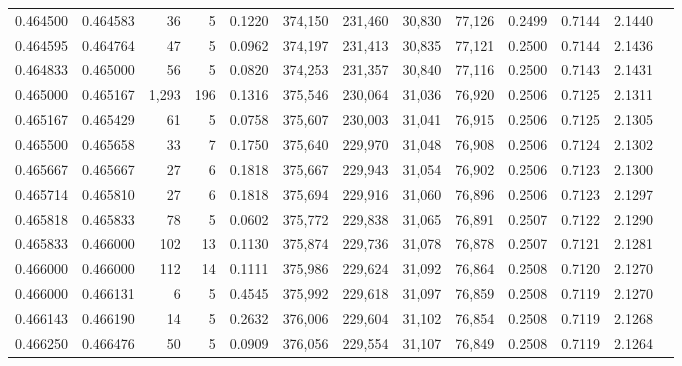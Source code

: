 \begin{tabular}{rrrrrrrrrrrrr}
0.464500 & 0.464583 &    36 &   5 &                                     0.1220 & 374,150 & 231,460 &  30,830 &  77,126 & 0.2499 & 0.7144 & 2.1440 \\
0.464595 & 0.464764 &    47 &   5 &                                     0.0962 & 374,197 & 231,413 &  30,835 &  77,121 & 0.2500 & 0.7144 & 2.1436 \\
0.464833 & 0.465000 &    56 &   5 &                                     0.0820 & 374,253 & 231,357 &  30,840 &  77,116 & 0.2500 & 0.7143 & 2.1431 \\
0.465000 & 0.465167 & 1,293 & 196 &                                     0.1316 & 375,546 & 230,064 &  31,036 &  76,920 & 0.2506 & 0.7125 & 2.1311 \\
0.465167 & 0.465429 &    61 &   5 &                                     0.0758 & 375,607 & 230,003 &  31,041 &  76,915 & 0.2506 & 0.7125 & 2.1305 \\
0.465500 & 0.465658 &    33 &   7 &                                     0.1750 & 375,640 & 229,970 &  31,048 &  76,908 & 0.2506 & 0.7124 & 2.1302 \\
0.465667 & 0.465667 &    27 &   6 &                                     0.1818 & 375,667 & 229,943 &  31,054 &  76,902 & 0.2506 & 0.7123 & 2.1300 \\
0.465714 & 0.465810 &    27 &   6 &                                     0.1818 & 375,694 & 229,916 &  31,060 &  76,896 & 0.2506 & 0.7123 & 2.1297 \\
0.465818 & 0.465833 &    78 &   5 &                                     0.0602 & 375,772 & 229,838 &  31,065 &  76,891 & 0.2507 & 0.7122 & 2.1290 \\
0.465833 & 0.466000 &   102 &  13 &                                     0.1130 & 375,874 & 229,736 &  31,078 &  76,878 & 0.2507 & 0.7121 & 2.1281 \\
0.466000 & 0.466000 &   112 &  14 &                                     0.1111 & 375,986 & 229,624 &  31,092 &  76,864 & 0.2508 & 0.7120 & 2.1270 \\
0.466000 & 0.466131 &     6 &   5 &                                     0.4545 & 375,992 & 229,618 &  31,097 &  76,859 & 0.2508 & 0.7119 & 2.1270 \\
0.466143 & 0.466190 &    14 &   5 &                                     0.2632 & 376,006 & 229,604 &  31,102 &  76,854 & 0.2508 & 0.7119 & 2.1268 \\
0.466250 & 0.466476 &    50 &   5 &                                     0.0909 & 376,056 & 229,554 &  31,107 &  76,849 & 0.2508 & 0.7119 & 2.1264 \\

\end{tabular}
